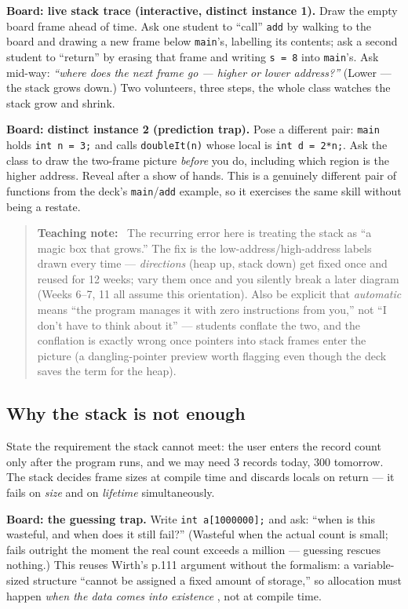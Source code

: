 \documentclass[11pt]{article}
\newenvironment{teachingaside}{\begin{quote}\small\color{primary-gold}\textbf{Teaching note:}\ }{\end{quote}}
\begin{document}
\textbf{Board: live stack trace (interactive, distinct instance 1).} Draw the empty board frame ahead of time. Ask one student to ``call'' \texttt{add} by walking to the board and drawing a new frame below \texttt{main}'s, labelling its contents; ask a second student to ``return'' by erasing that frame and writing \texttt{s = 8} into \texttt{main}'s. Ask mid-way: \emph{``where does the next frame go --- higher or lower address?''} (Lower --- the stack grows down.) Two volunteers, three steps, the whole class watches the stack grow and shrink.

\textbf{Board: distinct instance 2 (prediction trap).} Pose a different pair: \texttt{main} holds \texttt{int n = 3;} and calls \texttt{doubleIt(n)} whose local is \texttt{int d = 2*n;}. Ask the class to draw the two-frame picture \emph{before} you do, including which region is the higher address. Reveal after a show of hands. This is a genuinely different pair of functions from the deck's \texttt{main}/\texttt{add} example, so it exercises the same skill without being a restate.

\begin{teachingaside}
The recurring error here is treating the stack as ``a magic box that grows.'' The fix is the low-address/high-address labels drawn every time --- \emph{directions} (heap up, stack down) get fixed once and reused for 12 weeks; vary them once and you silently break a later diagram (Weeks 6--7, 11 all assume this orientation). Also be explicit that \emph{automatic} means ``the program manages it with zero instructions from you,'' not ``I don't have to think about it'' --- students conflate the two, and the conflation is exactly wrong once pointers into stack frames enter the picture (a dangling-pointer preview worth flagging even though the deck saves the term for the heap).
\end{teachingaside}

\subsection{Why the stack is not enough}

State the requirement the stack cannot meet: the user enters the record count only after the program runs, and we may need 3 records today, 300 tomorrow. The stack decides frame sizes at compile time and discards locals on return --- it fails on \emph{size} and on \emph{lifetime} simultaneously.

\textbf{Board: the guessing trap.} Write \texttt{int a[1000000];} and ask: ``when is this wasteful, and when does it still fail?'' (Wasteful when the actual count is small; fails outright the moment the real count exceeds a million --- guessing rescues nothing.) This reuses Wirth's p.111 argument without the formalism: a variable-sized structure ``cannot be assigned a fixed amount of storage,'' so allocation must happen \emph{when the data comes into existence} \cite{Wirth2004_algorithms_data_structures}, not at compile time.
\end{document}
